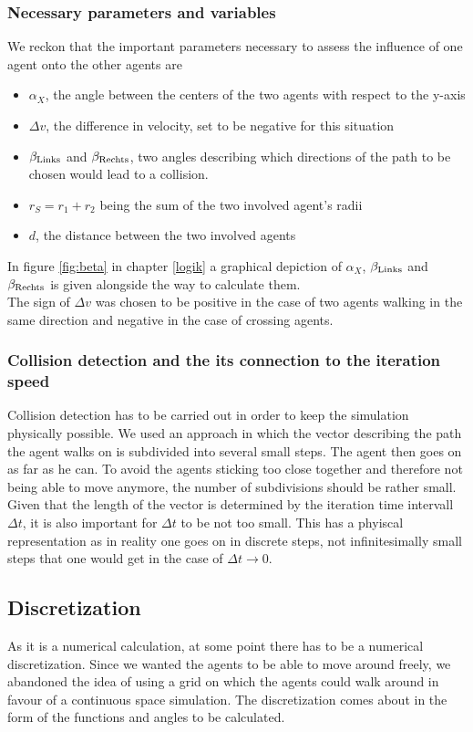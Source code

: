 \subsubsection{Necessary parameters and variables}
We reckon that the important parameters necessary to assess the influence of one agent onto the other agents are
\begin{itemize}
	\item $\alpha_X$, the angle between the centers of the two agents with respect to the y-axis
	\item $\Delta v$, the difference in velocity, set to be negative for this situation
	\item $\beta_{\text{Links}}$ and $\beta_{\text{Rechts}}$, two angles describing which directions of the path to be chosen would lead to a collision.
	\item $r_S = r_1 + r_2$ being the sum of the two involved agent's radii
	\item $d$, the distance between the two involved agents
\end{itemize}
\noi In figure \ref{fig:beta} in chapter \ref{logik} a graphical depiction of $\alpha_X$, $\beta_{\text{Links}}$ and $\beta_{\text{Rechts}}$ is given alongside the way to calculate them.\\
The sign of $\Delta v$ was chosen to be positive in the case of two agents walking in the same direction and negative in the case of crossing agents.

\subsubsection{Collision detection and the its connection to the iteration speed}
Collision detection has to be carried out in order to keep the simulation physically possible. We used an approach in which the vector describing the path the agent walks on is subdivided into several small steps. The agent then goes on as far as he can. To avoid the agents sticking too close together and therefore not being able to move anymore, the number of subdivisions should be rather small.\\
Given that the length of the vector is determined by the iteration time intervall $\Delta t$, it is also important for $\Delta t$ to be not too small. This has a phyiscal representation as in reality one goes on in discrete steps, not infinitesimally small steps that one would get in the case of $\Delta t \rightarrow 0$.

\subsection{Discretization}
As it is a numerical calculation, at some point there has to be a numerical discretization. Since we wanted the agents to be able to move around freely, we abandoned the idea of using a grid on which the agents could walk around in favour of a continuous space simulation. The discretization comes about in the form of the functions and angles to be calculated.

